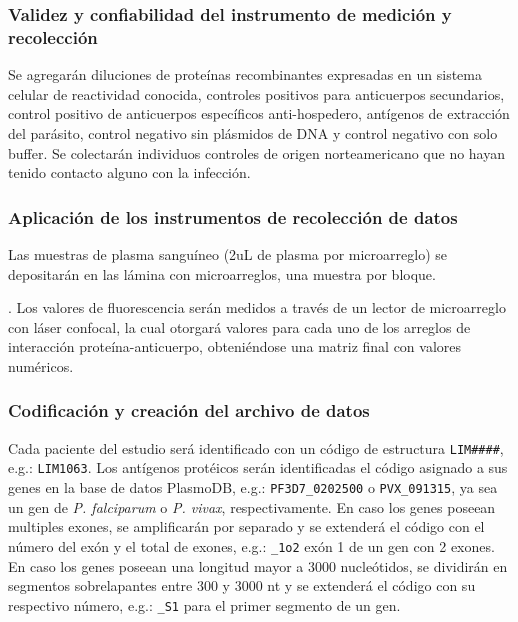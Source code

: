 \documentclass[]{article}
\begin{document}
\subsubsection{Validez y confiabilidad del instrumento de medición y
recolección}\label{validez}

Se agregarán diluciones de proteínas recombinantes expresadas en un
sistema celular de reactividad conocida, controles positivos para
anticuerpos secundarios, control positivo de anticuerpos específicos
anti-hospedero, antígenos de extracción del parásito, control negativo
sin plásmidos de DNA y control negativo con solo buffer. Se colectarán
individuos controles de origen norteamericano que no hayan tenido
contacto alguno con la infección.

\subsubsection{Aplicación de los instrumentos de recolección de
datos}\label{aplicacion-de-los-instrumentos-de-recoleccion-de-datos}

Las muestras de plasma sanguíneo (2uL de plasma por microarreglo) se
depositarán en las lámina con microarreglos, una muestra por bloque.

. Los valores de fluorescencia serán medidos a través de un lector de
microarreglo con láser confocal, la cual otorgará valores para cada uno
de los arreglos de interacción proteína-anticuerpo, obteniéndose una
matriz final con valores numéricos.

\subsubsection{Codificación y creación del archivo de
datos}\label{codificacion-y-creacion-del-archivo-de-datos}

Cada paciente del estudio será identificado con un código de estructura
\texttt{LIM\#\#\#\#}, e.g.: \texttt{LIM1063}. Los antígenos protéicos
serán identificadas el código asignado a sus genes en la base de datos
PlasmoDB, e.g.: \texttt{PF3D7\_0202500} o \texttt{PVX\_091315}, ya sea
un gen de \emph{P. falciparum} o \emph{P. vivax}, respectivamente. En
caso los genes poseean multiples exones, se amplificarán por separado y
se extenderá el código con el número del exón y el total de exones,
e.g.: \texttt{\_1o2} exón 1 de un gen con 2 exones. En caso los genes
poseean una longitud mayor a 3000 nucleótidos, se dividirán en segmentos
sobrelapantes entre 300 y 3000 nt y se extenderá el código con su
respectivo número, e.g.: \texttt{\_S1} para el primer segmento de un
gen.
\end{document}
